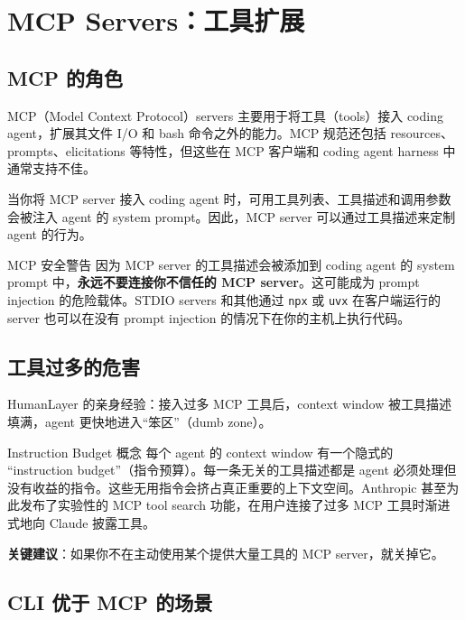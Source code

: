 \section{MCP Servers：工具扩展}

\subsection{MCP 的角色}

MCP（Model Context Protocol）servers 主要用于将工具（tools）接入 coding agent，扩展其文件 I/O 和 bash 命令之外的能力。MCP 规范还包括 resources、prompts、elicitations 等特性，但这些在 MCP 客户端和 coding agent harness 中通常支持不佳。

当你将 MCP server 接入 coding agent 时，可用工具列表、工具描述和调用参数会被注入 agent 的 system prompt。因此，MCP server 可以通过工具描述来定制 agent 的行为。

\begin{warningbox}{MCP 安全警告}
因为 MCP server 的工具描述会被添加到 coding agent 的 system prompt 中，\textbf{永远不要连接你不信任的 MCP server}。这可能成为 prompt injection 的危险载体。STDIO servers 和其他通过 \texttt{npx} 或 \texttt{uvx} 在客户端运行的 server 也可以在没有 prompt injection 的情况下在你的主机上执行代码。
\end{warningbox}

\subsection{工具过多的危害}

HumanLayer 的亲身经验：接入过多 MCP 工具后，context window 被工具描述填满，agent 更快地进入``笨区''（dumb zone）。

\begin{knowledgebox}{Instruction Budget 概念}
每个 agent 的 context window 有一个隐式的 ``instruction budget''（指令预算）。每一条无关的工具描述都是 agent 必须处理但没有收益的指令。这些无用指令会挤占真正重要的上下文空间。Anthropic 甚至为此发布了实验性的 MCP tool search 功能，在用户连接了过多 MCP 工具时渐进式地向 Claude 披露工具。
\end{knowledgebox}

\textbf{关键建议}：如果你不在主动使用某个提供大量工具的 MCP server，就关掉它。

\subsection{CLI 优于 MCP 的场景}

